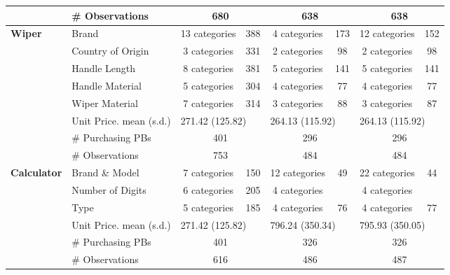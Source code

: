 \begin{longtable}{llccccccccc}
 & \# Observations & \multicolumn{3}{c}{680} & \multicolumn{3}{c}{638} & \multicolumn{3}{c}{638} \\* 
 \midrule 
 \multirow{8}{*}{\textbf{Wiper}} & Brand & \multicolumn{2}{c}{13 categories} & 388 & \multicolumn{2}{c}{4 categories} & 173 & \multicolumn{2}{c}{12 categories} & 152 \\* 
 & Country of Origin & \multicolumn{2}{c}{3 categories} & 331 & \multicolumn{2}{c}{2 categories} & 98 & \multicolumn{2}{c}{2 categories} & 98 \\* 
 & Handle Length & \multicolumn{2}{c}{8 categories} & 381 & \multicolumn{2}{c}{5 categories} & 141 & \multicolumn{2}{c}{5 categories} & 141 \\* 
 & Handle Material & \multicolumn{2}{c}{5 categories} & 304 & \multicolumn{2}{c}{4 categories} & 77 & \multicolumn{2}{c}{4 categories} & 77 \\* 
 & Wiper Material & \multicolumn{2}{c}{7 categories} & 314 & \multicolumn{2}{c}{3 categories} & 88 & \multicolumn{2}{c}{3 categories} & 87 \\* 
 \cmidrule{2-11} 
 & Unit Price. mean (s.d.) & \multicolumn{3}{l}{271.42 (125.82)} & \multicolumn{3}{l}{264.13 (115.92)} & \multicolumn{3}{l}{264.13 (115.92)} \\* 
 & \# Purchasing PBs & \multicolumn{3}{c}{401} & \multicolumn{3}{c}{296} & \multicolumn{3}{c}{296} \\* 
 & \# Observations & \multicolumn{3}{c}{753} & \multicolumn{3}{c}{484} & \multicolumn{3}{c}{484} \\* 
 \midrule 
 \multirow{6}{*}{\textbf{Calculator}} & Brand \& Model & \multicolumn{2}{c}{7 categories} & 150 & \multicolumn{2}{c}{12 categories} & 49 & \multicolumn{2}{c}{22 categories} & 44 \\* 
 \nopagebreak & Number of Digits & \multicolumn{2}{c}{6 categories} & 205 & \multicolumn{2}{c}{4 categories} &  & \multicolumn{2}{c}{4 categories} &  \\* 
 \nopagebreak & Type & \multicolumn{2}{c}{5 categories} & 185 & \multicolumn{2}{c}{4 categories} & 76 & \multicolumn{2}{c}{4 categories} & 77 \\* 
 \nopagebreak \cmidrule{2-11} 
 \nopagebreak & Unit Price. mean (s.d.) & \multicolumn{3}{l}{271.42 (125.82)} & \multicolumn{3}{l}{796.24 (350.34)} & \multicolumn{3}{l}{795.93 (350.05)} \\* 
 \nopagebreak & \# Purchasing PBs & \multicolumn{3}{c}{401} & \multicolumn{3}{c}{326} & \multicolumn{3}{c}{326} \\* 
 \nopagebreak & \# Observations & \multicolumn{3}{c}{616} & \multicolumn{3}{c}{486} & \multicolumn{3}{c}{487} \\* 

\end{longtable}
